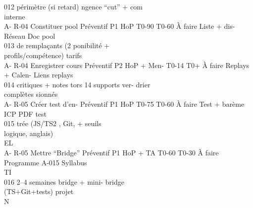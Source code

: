 012         périmètre (si retard) ngence                                            “cut” + com\\
interne\\
A- R-04    Constituer pool       Préventif P1    HoP          T0-90 T0-60 À faire   Liste + dis-  Réseau Doc pool\\
013        de remplaçants (2                                                        ponibilité +\\
profils/compétence)                                                      tarifs\\
A- R-04    Enregistrer cours     Préventif P2    HoP + Men- T0-14 T0+     À faire   Replays +     Calen-  Liens replays\\
014        critiques + notes                     tors             14                supports ver- drier\\
complètes                                                                sionnés\\
A- R-05    Créer test d’en-      Préventif P1    HoP          T0-75 T0-60 À faire   Test + barème ICP     PDF test\\
015        trée (JS/TS2 , Git,                                                      + seuils\\
logique, anglais)\\
\vspace{0.5em}
\vspace{0.5em}
\vspace{0.5em}
\vspace{0.5em}
EL\\
A- R-05    Mettre “Bridge”       Préventif P1    HoP + TA     T0-60 T0-30 À faire   Programme      A-015       Syllabus\\
\vspace{0.5em}
\vspace{0.5em}
\vspace{0.5em}
\vspace{0.5em}
TI\\
016        2–4 semaines                                                             bridge + mini-             bridge\\
(TS+Git+tests)                                                           projet\\
\vspace{0.5em}
\vspace{0.5em}
\vspace{0.5em}
\vspace{0.5em}
N\\
